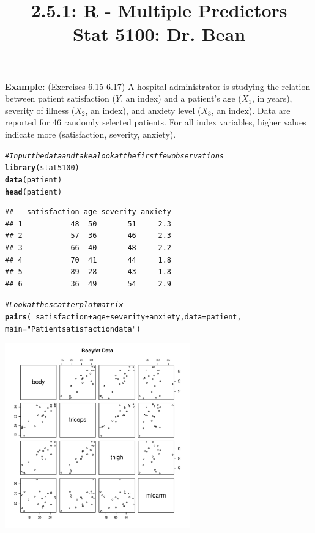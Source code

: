 \documentclass{article}\usepackage[]{graphicx}\usepackage[]{color}
\makeatletter
\newcommand{\hlstr}[1]{\textcolor[rgb]{0.192,0.494,0.8}{#1}}%
\newcommand{\hlcom}[1]{\textcolor[rgb]{0.678,0.584,0.686}{\textit{#1}}}%
\newcommand{\hlopt}[1]{\textcolor[rgb]{0,0,0}{#1}}%
\newcommand{\hlstd}[1]{\textcolor[rgb]{0.345,0.345,0.345}{#1}}%
\newcommand{\hlkwc}[1]{\textcolor[rgb]{0.333,0.667,0.333}{#1}}%
\newcommand{\hlkwd}[1]{\textcolor[rgb]{0.737,0.353,0.396}{\textbf{#1}}}%
\newenvironment{kframe}{%
 \def\at@end@of@kframe{}%
 \ifinner\ifhmode%
  \def\at@end@of@kframe{\end{minipage}}%
  \begin{minipage}{\columnwidth}%
 \fi\fi%
 \def\FrameCommand##1{\hskip\@totalleftmargin \hskip-\fboxsep
 \colorbox{shadecolor}{##1}\hskip-\fboxsep
     \hskip-\linewidth \hskip-\@totalleftmargin \hskip\columnwidth}%
 \MakeFramed {\advance\hsize-\width
   \@totalleftmargin\z@ \linewidth\hsize
   \@setminipage}}%
 {\par\unskip\endMakeFramed%
 \at@end@of@kframe}
\newenvironment{knitrout}{}{} %
\makeatother
\begin{document}
\title{%
  2.5.1: R - Multiple Predictors \\
  \smallskip
  \large Stat 5100: Dr. Bean
}
\date{}

\maketitle

\textbf{Example: } (Exercises 6.15-6.17) A hospital administrator is studying the relation between patient satisfaction ($Y$, an index) and a patient's age ($X_1$, in years), severity of illness ($X_2$, an index), and anxiety level ($X_3$, an index). Data are reported for 46 randomly selected patients. For all index variables, higher values indicate more (satisfaction, severity, anxiety).

\begin{knitrout}
\color{fgcolor}\begin{kframe}
\begin{alltt}
\hlcom{# Input the data and take a look at the first few observations}
\hlkwd{library}\hlstd{(stat5100)}
\hlkwd{data}\hlstd{(patient)}
\hlkwd{head}\hlstd{(patient)}
\end{alltt}
\begin{verbatim}
##   satisfaction age severity anxiety
## 1           48  50       51     2.3
## 2           57  36       46     2.3
## 3           66  40       48     2.2
## 4           70  41       44     1.8
## 5           89  28       43     1.8
## 6           36  49       54     2.9
\end{verbatim}
\begin{alltt}
\hlcom{# Look at the scatterplot matrix}
\hlkwd{pairs}\hlstd{(} \hlopt{~} \hlstd{satisfaction} \hlopt{+} \hlstd{age} \hlopt{+} \hlstd{severity} \hlopt{+} \hlstd{anxiety,} \hlkwc{data} \hlstd{= patient,}
       \hlkwc{main} \hlstd{=} \hlstr{"Patient satisfaction data"}\hlstd{)}
\end{alltt}
\end{kframe}
\includegraphics[width=0.6\textwidth]{figure/unnamed-chunk-1-1} 

\end{knitrout}
\end{document}
